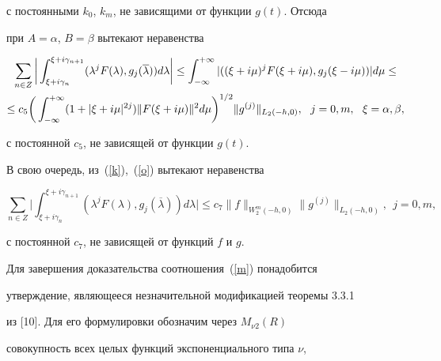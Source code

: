 с постоянными $k_0$, $k_m$, не зависящими от функции $g(t)$. Отсюда


при $A=\alpha$, $B=\beta$ вытекают неравенства


\begin{gather}


\sum\limits_{n\in Z}\bigg|\int_{\xi+i\gamma_n}^{\xi+i\gamma_{n+1}}


(\lambda^jF(\lambda),


g_j(\overline{\lambda}))d\lambda\bigg|\le\int_{-\infty}^{+\infty}


|((\xi+i\mu)^jF(\xi+i\mu),g_j(\xi-i\mu))|d\mu\le \notag \\


%


\label{o}


\le c_5\bigg(\int_{-\infty}^{+\infty}(1+|\xi+i\mu|^{2j})\|F(\xi+i\mu)\|^2


d\mu\bigg)^{1/2}\|g^{(j)}\|_{L_2(-h,0)},\ \ j=0,m,\ \ \xi=\alpha,\beta,


\end{gather}


с постоянной $c_5$, не зависящей от функции $g(t)$.





В свою очередь, из~(\ref{k}),~(\ref{o}) вытекают неравенства


\begin{equation}


\label{p}


\sum\limits_{n\in


Z}\bigg|\int_{\xi+i\gamma_n}^{\xi+i\gamma_{n+1}}(\lambda^jF(\lambda),


g_j(\overline{\lambda}))d\lambda\bigg|\le c_7\|f\|_{W_2^m(-h,0)}


\|g^{(j)}\|_{L_2(-h,0)},\ \ j=0,m,


\end{equation}


с постоянной $c_7$, не зависящей от функций $f$ и $g$.





Для завершения доказательства соотношения~(\ref{m}) понадобится


утверждение, являющееся незначительной модификацией теоремы 3.3.1


из [10]. Для его формулировки обозначим через $M_{\nu 2}(R)$


совокупность всех целых функций экспоненциального типа $\nu$,


